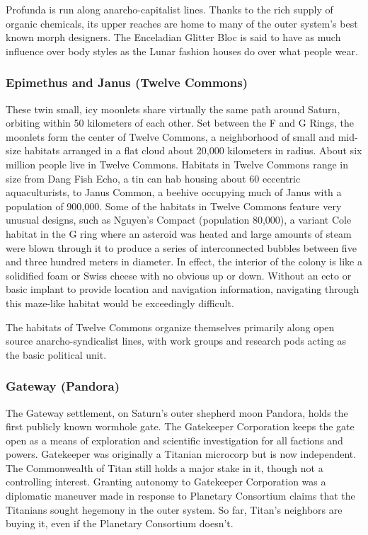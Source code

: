 Profunda is run along anarcho-capitalist lines. Thanks to the rich
supply of organic chemicals, its upper reaches are home to many of the
outer system’s best known morph designers. The Enceladian Glitter Bloc
is said to have as much influence over body styles as the Lunar
fashion houses do over what people wear.

\subsubsection{Epimethus and Janus (Twelve Commons)}
\label{sec:epim-janus-twelve}

These twin small, icy moonlets share virtually the same path around
Saturn, orbiting within 50 kilometers of each other. Set between the F
and G Rings, the moonlets form the center of Twelve Commons, a
neighborhood of small and mid-size habitats arranged in a flat cloud
about 20,000 kilometers in radius. About six million people live in
Twelve Commons. Habitats in Twelve Commons range in size from Dang
Fish Echo, a tin can hab housing about 60 eccentric aquaculturists, to
Janus Common, a beehive occupying much of Janus with a population of
900,000. Some of the habitats in Twelve Commons feature very unusual
designs, such as Nguyen’s Compact (population 80,000), a variant Cole
habitat in the G ring where an asteroid was heated and large amounts
of steam were blown through it to produce a series of interconnected
bubbles between five and three hundred meters in diameter. In effect,
the interior of the colony is like a solidified foam or Swiss cheese
with no obvious up or down. Without an ecto or basic implant to
provide location and navigation information, navigating through this
maze-like habitat would be exceedingly difficult.

The habitats of Twelve Commons organize themselves primarily along
open source anarcho-syndicalist lines, with work groups and research
pods acting as the basic political unit.

\subsubsection{Gateway (Pandora)}
\label{sec:gateway-pandora}

The Gateway settlement, on Saturn's outer shepherd moon Pandora, holds
the first publicly known wormhole gate. The Gatekeeper Corporation
keeps the gate open as a means of exploration and scientific
investigation for all factions and powers. Gatekeeper was originally a
Titanian microcorp but is now independent. The Commonwealth of Titan
still holds a major stake in it, though not a controlling interest.
Granting autonomy to Gatekeeper Corporation was a diplomatic maneuver
made in response to Planetary Consortium claims that the Titanians
sought hegemony in the outer system. So far, Titan's neighbors are
buying it, even if the Planetary Consortium doesn't.

